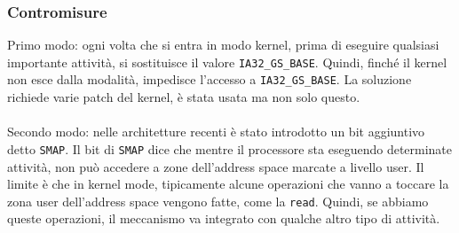 \documentclass[12pt, oneside]{extbook}
\begin{document}
\subsubsection{Contromisure}
Primo modo: ogni volta che si entra in modo kernel, prima di eseguire qualsiasi importante attività, si sostituisce il valore \texttt{IA32\_GS\_BASE}. Quindi, finché il kernel non esce dalla modalità, impedisce l'accesso a \texttt{IA32\_GS\_BASE}. La soluzione richiede varie patch del kernel, è stata usata ma non solo questo.\\\\
Secondo modo: nelle architetture recenti è stato introdotto un bit aggiuntivo detto \texttt{SMAP}. Il bit di \texttt{SMAP} dice che mentre il processore sta eseguendo determinate attività, non può accedere a zone dell'address space marcate a livello user. Il limite è che in kernel mode, tipicamente alcune operazioni che vanno a toccare la zona user dell'address space vengono fatte, come la \texttt{read}. Quindi, se abbiamo queste operazioni, il meccanismo va integrato con qualche altro tipo di attività.
\end{document}
